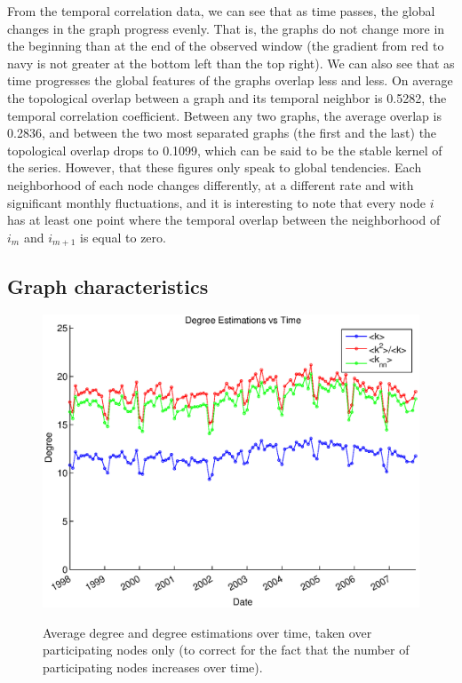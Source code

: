 \documentclass[12pt]{article}
\begin{document}
From the temporal correlation data, we can see that as time passes, the global changes in the graph progress evenly. That is, the graphs do not change more in the beginning than at the end of the observed window (the gradient from red to navy is not greater at the bottom left than the top right). We can also see that as time progresses the global features of the graphs overlap less and less. On average the topological overlap between a graph and its temporal neighbor is 0.5282, the temporal correlation coefficient. Between any two graphs, the average overlap is 0.2836, and between the two most separated graphs (the first and the last) the topological overlap drops to 0.1099, which can be said to be the stable kernel of the series. \newline However, that these figures only speak to global tendencies. Each neighborhood of each node changes differently, at a different rate and with significant monthly fluctuations, and it is interesting to note that every node \(i\) has at least one point where the temporal overlap between the neighborhood of \(i_m\) and \(i_{m+1}\) is equal to zero.



\subsection{Graph characteristics}

\begin{figure}[H]
\includegraphics[trim = 0cm 0cm 0cm 0cm, width = .9\textwidth]{Graficos/NearestNeighbors.eps}
\label{fig:k}
\caption{Average degree and degree estimations over time, taken over participating nodes only (to correct for the fact that the number of participating nodes increases over time). }
\label{fig:nn}
\end{figure}
\end{document}
